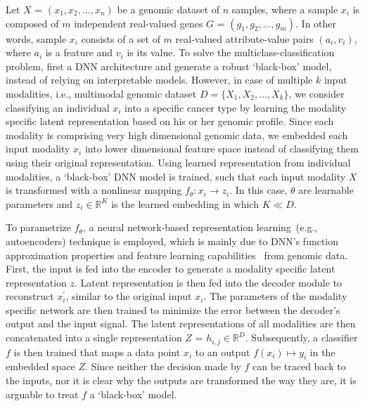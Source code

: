 \hspace*{3.5mm} Let $X$ = $\left(x_{1}, x_{2}, \ldots, x_{n}\right)$ be a genomic dataset of $n$ samples, where a sample $x_i$ is composed of $m$ independent real-valued genes $G$ = $\left(g_{1}, g_{2}, \ldots, g_{m}\right)$. %
In other words, sample $x_i$ consists of a set of $m$ real-valued attribute-value pairs $\left(a_{i}, v_{i}\right)$, where $a_i$ is a feature and $v_i$ is its value. 
To solve the multiclass-classification problem, first a DNN architecture and generate a robust `black-box' model, instead of relying on interpretable models. However, in case of multiple $k$ input modalities, 
i.e., multimodal genomic dataset $D=\{X_1, X_2,..., X_k\}$, we  consider classifying an individual $x_i$ into a specific cancer type by learning the modality specific latent representation based on his or her genomic profile. %
Since each modality is comprising very high dimensional genomic data, we embedded each input modality $x_i$ into lower dimensional feature space instead of classifying them using their original representation. Using learned representation from individual modalities, a `black-box' DNN model is trained, such that each input modality $X$ is transformed with a nonlinear mapping $f_{\theta}: x_i \rightarrow z_i$. In this case, $\theta$ are learnable parameters and $z_i \in \mathbb{R}^{K}$ is the learned embedding in which $K \ll D$. 

\hspace*{3.5mm} To parametrize $f_{\theta}$, a neural network-based representation learning~(e.g., autoencoders) technique is employed, which is mainly due to DNN's function approximation properties and feature learning capabilities~\cite{xie2016unsupervised} from genomic data. First, the input is fed into the encoder %
to generate a modality specific latent representation $z$. Latent representation is then fed into the decoder module to reconstruct ${x}_{i}^{\prime}$, similar to the original input $x_i$. The parameters of the modality specific network are then trained to minimize the error between the decoder’s output and the input signal. The latent representations of all modalities are then concatenated into a single representation $Z$ = $h_{i,j} \in \mathbb{R}^{D}$. Subsequently, a classifier $f$ is then trained that maps a data point $x_i$ to an output $f(x_i) \mapsto y_i$ in the embedded space $Z$. Since neither the decision made by $f$ can be traced back to the inputs, nor it is clear why the outputs are transformed the way they are, it is arguable to treat $f$ a `black-box' model. 

